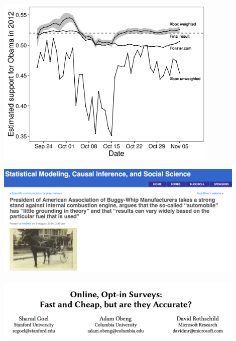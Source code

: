 \documentclass[aspectratio=169]{beamer}
\begin{document}
\begin{frame}

\begin{center}
\includegraphics[width=0.8\textwidth]{figures/bitbybit3-8_wang_forecasting_2015_fig2_and_3}
\end{center}

\end{frame}
\begin{frame}

\begin{center}
\includegraphics[width=0.9\textwidth]{figures/gelman_buggywhip_blogpost}
\end{center}

\vfill
{}

\end{frame}
\begin{frame}

\begin{center}
\includegraphics[width=0.9\textwidth]{figures/goel_online_2017_title}
\end{center}

\end{frame}
\end{document}
